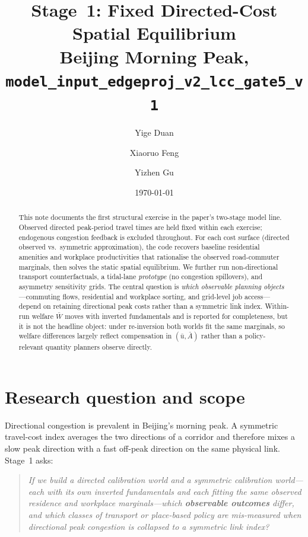 \documentclass[12pt]{article}
\title{Stage~1: Fixed Directed-Cost Spatial Equilibrium\\[0.4em]
\large Beijing Morning Peak, \texttt{model\_input\_edgeproj\_v2\_lcc\_gate5\_v1}}
\author{Yige Duan \and Xiaoruo Feng \and Yizhen Gu}
\date{\today}
\newcommand{\Wbar}{\bar W}
\begin{document}
\maketitle

\begin{abstract}
\noindent
This note documents the first structural exercise in the paper's two-stage model line.
Observed directed peak-period travel times are held fixed within each exercise; endogenous
congestion feedback is excluded throughout.
For each cost surface (directed observed vs.\ symmetric approximation), the code
recovers baseline residential amenities and workplace productivities that rationalise
the observed road-commuter marginals, then solves the static spatial equilibrium.
We further run non-directional transport counterfactuals, a tidal-lane \emph{prototype}
(no congestion spillovers), and asymmetry sensitivity grids.
The central question is \emph{which observable planning objects}---commuting flows,
residential and workplace sorting, and grid-level job access---depend on retaining
directional peak costs rather than a symmetric link index.
Within-run welfare $\Wbar$ moves with inverted fundamentals and is reported for
completeness, but it is not the headline object: under re-inversion both worlds fit
the same marginals, so welfare differences largely reflect compensation in
$(\bar u,\bar A)$ rather than a policy-relevant quantity planners observe directly.
\end{abstract}

\section{Research question and scope}\label{sec:question}

Directional congestion is prevalent in Beijing's morning peak.
A symmetric travel-cost index averages the two directions of a corridor and therefore
mixes a slow peak direction with a fast off-peak direction on the same physical link.
Stage~1 asks:
\begin{quote}
\noindent
\emph{If we build a directed calibration world and a symmetric calibration world---each
with its own inverted fundamentals and each fitting the same observed residence and
workplace marginals---which \textbf{observable outcomes} differ, and which classes of
transport or place-based policy are mis-measured when directional peak congestion is
collapsed to a symmetric link index?}
\end{quote}
\end{document}
